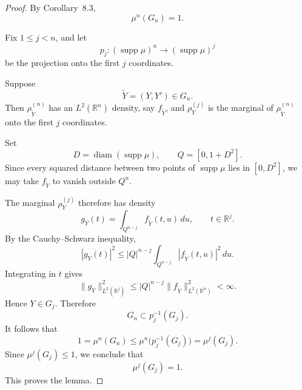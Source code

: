 \documentclass[11pt]{article}
\theoremstyle{remark}
\numberwithin{equation}{section}
\newcommand{\1}{\mathbf 1}
\begin{document}
\begin{proof}
By Corollary~8.3,
\[
\mu^n(G_n)=1.
\]

Fix $1\le j<n$, and let
\[
p_j:(\operatorname{supp}\mu)^n
\longrightarrow
(\operatorname{supp}\mu)^j
\]
be the projection onto the first $j$ coordinates.

Suppose
\[
\widetilde Y=(Y,Y')\in G_n.
\]
Then $\rho_{\widetilde Y}^{(n)}$ has an
$L^2(\mathbb R^n)$ density, say $f_{\widetilde Y}$, and
$\rho_Y^{(j)}$ is the marginal of $\rho_{\widetilde Y}^{(n)}$
onto the first $j$ coordinates.

Set
\[
D=\operatorname{diam}(\operatorname{supp}\mu),
\qquad
Q=[0,1+D^2].
\]
Since every squared distance between two points of
$\operatorname{supp}\mu$ lies in $[0,D^2]$, we may take
$f_{\widetilde Y}$ to vanish outside $Q^n$.

The marginal $\rho_Y^{(j)}$ therefore has density
\[
g_Y(t)
=
\int_{Q^{n-j}}
f_{\widetilde Y}(t,u)\,du,
\qquad
t\in\mathbb R^j.
\]
By the Cauchy--Schwarz inequality,
\[
|g_Y(t)|^2
\le
|Q|^{n-j}
\int_{Q^{n-j}}
|f_{\widetilde Y}(t,u)|^2\,du.
\]
Integrating in $t$ gives
\[
\|g_Y\|_{L^2(\mathbb R^j)}^2
\le
|Q|^{n-j}
\|f_{\widetilde Y}\|_{L^2(\mathbb R^n)}^2
<\infty.
\]
Hence $Y\in G_j$. Therefore
\[
G_n\subset p_j^{-1}(G_j).
\]
It follows that
\[
1
=
\mu^n(G_n)
\le
\mu^n\bigl(p_j^{-1}(G_j)\bigr)
=
\mu^j(G_j).
\]
Since $\mu^j(G_j)\le1$, we conclude that
\[
\mu^j(G_j)=1.
\]
This proves the lemma.
\end{proof}
\end{document}
